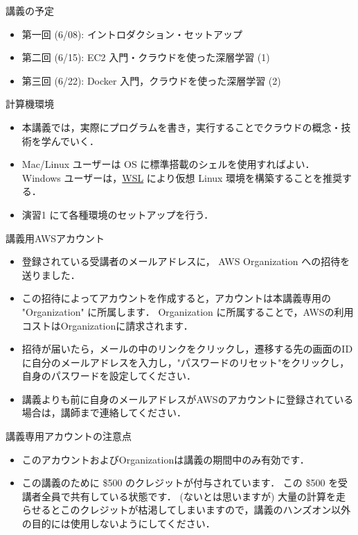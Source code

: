 \documentclass[unicode,11pt]{beamer}
\begin{document}
\begin{frame}{講義の予定}
    \begin{itemize}
        \item 第一回 (6/08): イントロダクション・セットアップ
        \item 第二回 (6/15): EC2 入門・クラウドを使った深層学習 (1)
        \item 第三回 (6/22): Docker 入門，クラウドを使った深層学習 (2)
    \end{itemize}
\end{frame}

\begin{frame}{計算機環境}

\begin{itemize}
    \item 本講義では，実際にプログラムを書き，実行することでクラウドの概念・技術を学んでいく．
    \item Mac/Linux ユーザーは OS に標準搭載のシェルを使用すればよい．
Windows ユーザーは，\href{https://docs.microsoft.com/en-us/windows/wsl/install}{WSL} により仮想 Linux 環境を構築することを推奨する．
    \item 演習1 にて各種環境のセットアップを行う．
\end{itemize}

\end{frame}

\begin{frame}{講義用AWSアカウント}

\begin{itemize}
    \item 登録されている受講者のメールアドレスに， AWS Organization への招待を送りました．
    \item この招待によってアカウントを作成すると，アカウントは本講義専用の "Organization" に所属します．
    \teim Organization に所属することで，AWSの利用コストはOrganizationに請求されます．
    \item 招待が届いたら，メールの中のリンクをクリックし，遷移する先の画面のIDに自分のメールアドレスを入力し，"パスワードのリセット"をクリックし，自身のパスワードを設定してください．
    \item 講義よりも前に自身のメールアドレスがAWSのアカウントに登録されている場合は，講師まで連絡してください．
\end{itemize}

\end{frame}

\begin{frame}{講義専用アカウントの注意点}

\begin{itemize}
    \item このアカウントおよびOrganizationは講義の期間中のみ有効です．
    \item この講義のために \$500 のクレジットが付与されています．
    この \$500 を受講者全員で共有している状態です．
    (ないとは思いますが) 大量の計算を走らせるとこのクレジットが枯渇してしまいますので，講義のハンズオン以外の目的には使用しないようにしてください．
\end{itemize}

\end{frame}
\end{document}
